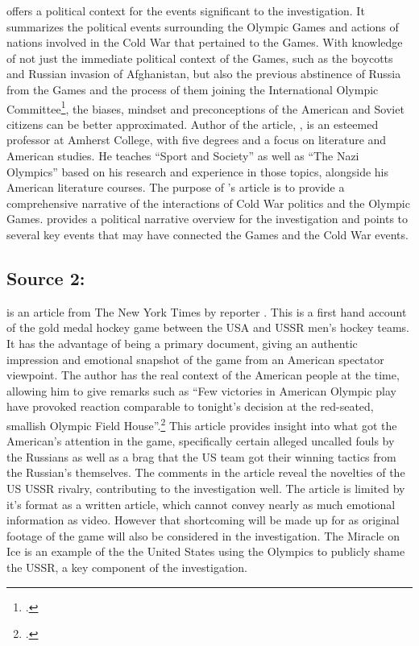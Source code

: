 \documentclass[12pt,letterpaper]{article}
\begin{document}
 offers a political context for the events significant to the investigation. It summarizes the political events surrounding the Olympic Games and actions of nations involved in the Cold War that pertained to the Games. With knowledge of not just the immediate political context of the Games, such as the boycotts and Russian invasion of Afghanistan, but also the previous abstinence of Russia from the Games and the process of them joining the International Olympic Committee\footcite[555-558]{guttmann_cold_1988}, the biases, mindset and preconceptions of the American and Soviet citizens can be better approximated. Author of the article, \citeauthor{guttmann_cold_1988}, is an esteemed professor at Amherst College, with five degrees and a focus on literature and American studies. He teaches ``Sport and Society'' as well as ``The Nazi Olympics'' based on his research and experience in those topics, alongside his American literature courses. The purpose of \citeauthor{guttmann_cold_1988}'s article is to provide a comprehensive narrative of the interactions of Cold War politics and the Olympic Games.  provides a political narrative overview for the investigation and points to several key events that may have connected the Games and the Cold War events.

\subsection{Source 2: }

 is an article from The New York Times by reporter \citeauthor{eskenazi_u.s._1980}. This is a first hand account of the gold medal hockey game between the USA and USSR men's hockey teams. It has the advantage of being a primary document, giving an authentic impression and emotional snapshot of the game from an American spectator viewpoint. The author has the real context of the American people at the time, allowing him to give remarks such as ``Few victories in American Olympic play have provoked reaction comparable to tonight's decision at the red-seated, smallish Olympic Field House''.\footcite{eskenazi_u.s._1980} This article provides insight into what got the American's attention in the game, specifically certain alleged uncalled fouls by the Russians as well as a brag that the US team got their winning tactics from the Russian's themselves. The comments in the article reveal the novelties of the US USSR rivalry, contributing to the investigation well. The article is limited by it's format as a written article, which cannot convey nearly as much emotional information as video. However that shortcoming will be made up for as original footage of the game will also be considered in the investigation. The Miracle on Ice is an example of the the United States using the Olympics to publicly shame the USSR, a key component of the investigation. 
\end{document}
